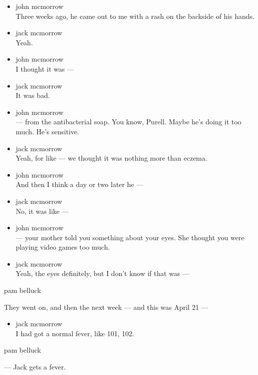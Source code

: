 \begin{itemize}
\item
  john mcmorrow\\
  Three weeks ago, he came out to me with a rash on the backside of his
  hands.
\item
  jack mcmorrow\\
  Yeah.
\item
  john mcmorrow\\
  I thought it was ---
\item
  jack mcmorrow\\
  It was bad.
\item
  john mcmorrow\\
  --- from the antibacterial soap. You know, Purell. Maybe he's doing it
  too much. He's sensitive.
\item
  jack mcmorrow\\
  Yeah, for like --- we thought it was nothing more than eczema.
\item
  john mcmorrow\\
  And then I think a day or two later he ---
\item
  jack mcmorrow\\
  No, it was like ---
\item
  john mcmorrow\\
  --- your mother told you something about your eyes. She thought you
  were playing video games too much.
\item
  jack mcmorrow\\
  Yeah, the eyes definitely, but I don't know if that was ---
\end{itemize}

pam belluck

They went on, and then the next week --- and this was April 21 ---

\begin{itemize}
\tightlist
\item
  jack mcmorrow\\
  I had got a normal fever, like 101, 102.
\end{itemize}

pam belluck

--- Jack gets a fever.


